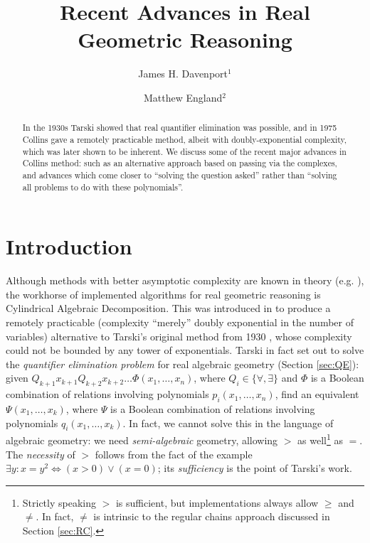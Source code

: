 \documentclass[runningheads,a4paper]{llncs}
\begin{document}
\mainmatter





\title{Recent Advances in Real Geometric Reasoning}  
\author{James H. Davenport$^1$ \and Matthew England$^2$}






\maketitle
\begin{abstract}
In the 1930s Tarski showed that real quantifier elimination was possible, and in 1975 Collins gave a remotely practicable method, albeit with doubly-exponential complexity, which was later shown to be inherent. We discuss some of the recent major advances in Collins method: such as an alternative approach based on passing via the complexes, and advances which come closer to ``solving the question asked'' rather than ``solving all problems to do with these polynomials''.
\end{abstract}

\section{Introduction}

Although methods with better asymptotic complexity are known in theory (e.g. \cite{GrigorievVorobjov1988a}), the workhorse of implemented algorithms for real geometric reasoning is Cylindrical Algebraic Decomposition. This was introduced in \cite{Collins1975} to produce a remotely practicable (complexity ``merely'' doubly exponential in the number of variables) alternative to Tarski's original method from 1930 \cite{Tarski1951}, whose complexity could not be bounded by any tower of exponentials. Tarski in fact set out to solve the \emph{quantifier elimination problem} for real algebraic geometry (Section \ref{sec:QE}): given $Q_{k+1} x_{k+1}Q_{k+2} x_{k+2}\dots \Phi(x_1,\ldots,x_n)$, where $Q_i\in\{\forall,\exists\}$ and $\Phi$ is a Boolean combination of relations involving polynomials $p_i(x_1,\ldots,x_n)$, find an equivalent $\Psi(x_1,\ldots,x_k)$, where $\Psi$ is a Boolean combination of relations involving polynomials $q_i(x_1,\ldots,x_k)$. In fact, we cannot solve this in the language of algebraic geometry: we need \emph{semi-algebraic} geometry, allowing $>$ as well\footnote{Strictly speaking $>$ is sufficient, but implementations always allow $\ge$ and $\ne$. In fact, $\ne$ is intrinsic to the regular chains approach discussed in Section \ref{sec:RC}.} as $=$. The \emph{necessity} of $>$ follows from the fact of the example $\exists y: x=y^2  \Leftrightarrow (x>0)\lor(x=0)$; its \emph{sufficiency} is the point of Tarski's work.
\end{document}

